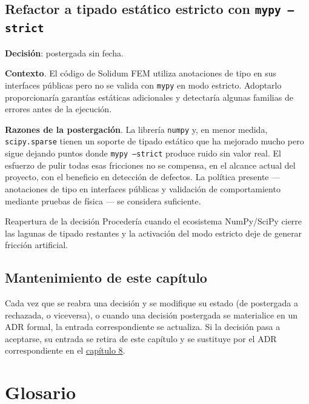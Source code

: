 \documentclass[11pt,oneside]{report}
\begin{document}
\section{Refactor a tipado estático estricto con \texttt{mypy --strict}}

\textbf{Decisión}: postergada sin fecha.

\textbf{Contexto}. El código de Solidum FEM utiliza anotaciones de tipo en sus interfaces públicas pero no se valida con \texttt{mypy} en modo estricto. Adoptarlo proporcionaría garantías estáticas adicionales y detectaría algunas familias de errores antes de la ejecución.

\textbf{Razones de la postergación}. La librería \texttt{numpy} y, en menor medida, \texttt{scipy.sparse} tienen un soporte de tipado estático que ha mejorado mucho pero sigue dejando puntos donde \texttt{mypy --strict} produce ruido sin valor real. El esfuerzo de pulir todas esas fricciones no se compensa, en el alcance actual del proyecto, con el beneficio en detección de defectos. La política presente --- anotaciones de tipo en interfaces públicas y validación de comportamiento mediante pruebas de física --- se considera suficiente.

\begin{infobox}{Reapertura de la decisión}
Procedería cuando el ecosistema NumPy/SciPy cierre las lagunas de tipado restantes y la activación del modo estricto deje de generar fricción artificial.
\end{infobox}

\section{Mantenimiento de este capítulo}

Cada vez que se reabra una decisión y se modifique su estado (de \textquotedbl{}postergada\textquotedbl{} a \textquotedbl{}rechazada\textquotedbl{}, o viceversa), o cuando una decisión postergada se materialice en un ADR formal, la entrada correspondiente se actualiza. Si la decisión pasa a aceptarse, su entrada se retira de este capítulo y se sustituye por el ADR correspondiente en el \hyperref[cap:8]{capítulo 8}.


\newpage

\chapter{Glosario}
\label{cap:11}
\end{document}
